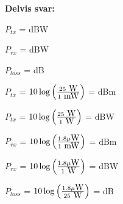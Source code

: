 
\noindent
{\bf Delvis svar:}

\vskip 10pt

$P_{tx}$ =  dBW 

\vskip 10pt

$P_{rx}$ =  dBW 

\vskip 10pt

$P_{loss}$ =  dB








$P_{tx}$ = $10 \log \left( 25 \hbox { W} \over 1 \hbox{ mW} \right)$ =  dBm  

\vskip 10pt

$P_{tx}$ = $10 \log \left( 25 \hbox { W} \over 1 \hbox{ W} \right)$ =  dBW 

\vskip 10pt

$P_{rx}$ = $10 \log \left( 1.8 \mu \hbox {W} \over 1 \hbox{ mW} \right)$ =  dBm 

\vskip 10pt

$P_{rx}$ = $10 \log \left( 1.8 \mu \hbox {W} \over 1 \hbox{ W} \right)$ =  dBW 

\vskip 10pt

$P_{loss}$ = $10 \log \left( 1.8 \mu \hbox {W} \over 25 \hbox{ W} \right)$ =  dB




